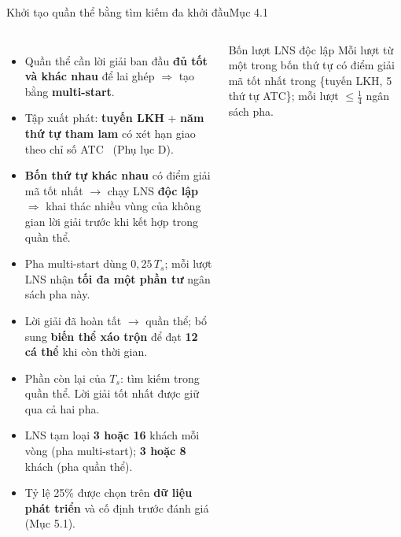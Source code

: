 \documentclass[aspectratio=169,10pt,t,xcolor={table}]{beamer}
\newcommand{\src}[1]{\hfill{\normalfont\footnotesize\color{white!62!navy}#1}}  %
\begin{document}
\begin{frame}{Khởi tạo quần thể bằng tìm kiếm đa khởi đầu\src{Mục 4.1}}
\begin{columns}[T,onlytextwidth]
\begin{itemize}\footnotesize
\item Quần thể cần lời giải ban đầu \textbf{đủ tốt và khác nhau} để lai ghép $\Rightarrow$ tạo bằng \textbf{multi-start}.
\item Tập xuất phát: \textbf{tuyến LKH} + \textbf{năm thứ tự tham lam} có xét hạn giao theo chỉ số ATC~\cite{lkh2000,atc1987} (Phụ lục D).
\item \textbf{Bốn thứ tự khác nhau} có điểm giải mã tốt nhất $\to$ chạy LNS \textbf{độc lập} $\Rightarrow$ khai thác nhiều vùng của không gian lời giải trước khi kết hợp trong quần thể.
\item Pha multi-start dùng $0{,}25\,T_s$; mỗi lượt LNS nhận \textbf{tối đa một phần tư} ngân sách pha này.
\item Lời giải đã hoàn tất $\to$ quần thể; bổ sung \textbf{biến thể xáo trộn} để đạt \textbf{12 cá thể} khi còn thời gian.
\item Phần còn lại của $T_s$: tìm kiếm trong quần thể. Lời giải tốt nhất được giữ qua cả hai pha.
\item LNS tạm loại \textbf{3 hoặc 16} khách mỗi vòng (pha multi-start); \textbf{3 hoặc 8} khách (pha quần thể).
\item Tỷ lệ 25\% được chọn trên \textbf{dữ liệu phát triển} và cố định trước đánh giá (Mục 5.1).
\end{itemize}
\centering
{}
\vspace{6pt}
\begin{block}{Bốn lượt LNS độc lập}
\scriptsize
Mỗi lượt từ một trong bốn thứ tự có điểm giải mã tốt nhất trong \{tuyến LKH, 5 thứ tự ATC\}; mỗi lượt $\le\frac14$ ngân sách pha.
\end{block}
\end{columns}
\end{frame}
\end{document}
